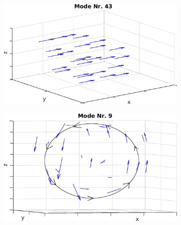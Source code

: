 \documentclass[numbers=noenddot,a4paper,notitlepage,twoside,BCOR15mm]{scrbook}
\begin{document}
\begin{figure}[!t]
						\begin{subfigure}[t]{0.325\textwidth}
							\centering
							\includegraphics[width=\textwidth,height=0.8\textwidth]{figs/auswertung/manipulation/erstensungestModeNr43.png}
						\end{subfigure}
						\begin{subfigure}[t]{0.325\textwidth}
							\centering
							\includegraphics[width=\textwidth,height=0.8\textwidth]{figs/auswertung/manipulation/erstensungestModeNr9.png}
						\end{subfigure}
						\begin{subfigure}[t]{0.325\textwidth}

\end{subfigure}
\end{figure}
\end{document}
